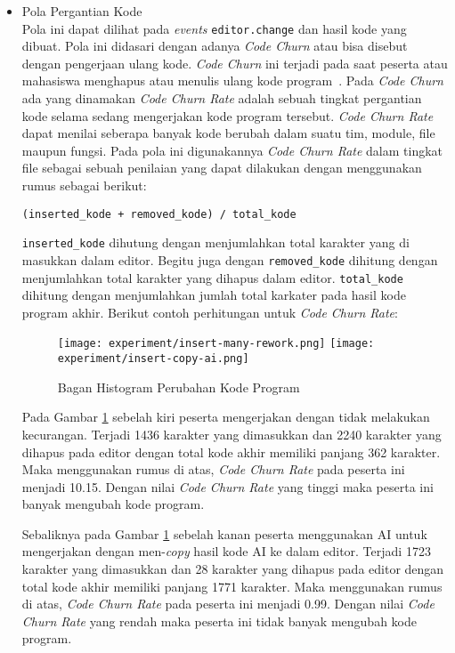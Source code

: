 \begin{itemize}
    \item Pola Pergantian Kode \\
    Pola ini dapat dilihat pada \textit{events} \verb|editor.change| dan hasil kode yang dibuat. Pola ini didasari dengan adanya \textit{Code Churn} atau bisa disebut dengan pengerjaan ulang kode. \textit{Code Churn} ini terjadi pada saat peserta atau mahasiswa menghapus atau menulis ulang kode program~\cite{hatica:churn}. Pada \textit{Code Churn} ada yang dinamakan \textit{Code Churn Rate} adalah sebuah tingkat pergantian kode selama sedang mengerjakan kode program tersebut. \textit{Code Churn Rate} dapat menilai seberapa banyak kode berubah dalam suatu tim, module, file maupun fungsi. Pada pola ini digunakannya \textit{Code Churn Rate} dalam tingkat file sebagai sebuah penilaian yang dapat dilakukan dengan menggunakan rumus sebagai berikut:
    
    \begin{center}
        \verb|(inserted_kode + removed_kode) / total_kode|
    \end{center}

    \verb|inserted_kode| dihutung dengan menjumlahkan total karakter yang di masukkan dalam editor. Begitu juga dengan \verb|removed_kode| dihitung dengan menjumlahkan total karakter yang dihapus dalam editor. \verb|total_kode| dihitung dengan menjumlahkan jumlah total karkater pada hasil kode program akhir. Berikut contoh perhitungan untuk \textit{Code Churn Rate}:

    \begin{figure}[H]
        \centering
        \texttt{[image: experiment/insert-many-rework.png]}
        \texttt{[image: experiment/insert-copy-ai.png]}
        \caption{Bagan Histogram Perubahan Kode Program}
        \label{fig:5:2:3:rework}
    \end{figure}

    Pada Gambar \ref{fig:5:2:3:rework} sebelah kiri peserta mengerjakan dengan tidak melakukan kecurangan. Terjadi 1436 karakter yang dimasukkan dan 2240 karakter yang dihapus pada editor dengan total kode akhir memiliki panjang 362 karakter. Maka menggunakan rumus di atas, \textit{Code Churn Rate} pada peserta ini menjadi 10.15. Dengan nilai \textit{Code Churn Rate} yang tinggi maka peserta ini banyak mengubah kode program.
    
    Sebaliknya pada Gambar \ref{fig:5:2:3:rework} sebelah kanan peserta menggunakan AI untuk mengerjakan dengan men-\textit{copy} hasil kode AI ke dalam editor. Terjadi 1723 karakter yang dimasukkan dan 28 karakter yang dihapus pada editor dengan total kode akhir memiliki panjang 1771 karakter. Maka menggunakan rumus di atas, \textit{Code Churn Rate} pada peserta ini menjadi 0.99. Dengan nilai \textit{Code Churn Rate} yang rendah maka peserta ini tidak banyak mengubah kode program.


\end{itemize}
